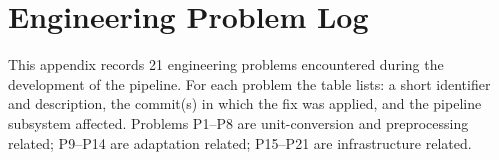 \chapter{Engineering Problem Log}
\label{app:engineering_log}

This appendix records 21 engineering problems encountered during the
development of the pipeline.
For each problem the table lists: a short identifier and description,
the commit(s) in which the fix was applied, and the pipeline subsystem affected.
Problems P1--P8 are unit-conversion and preprocessing related;
P9--P14 are adaptation related; P15--P21 are infrastructure related.

